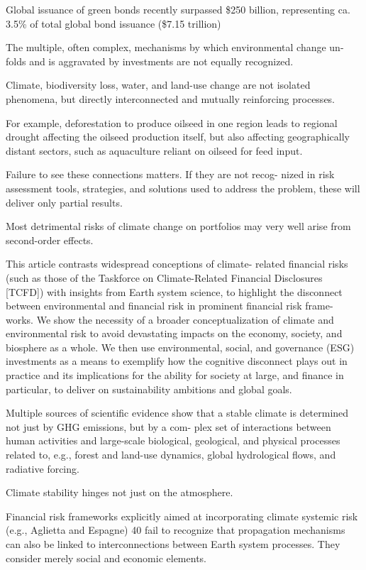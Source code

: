 \documentclass[
]{book}
\begin{document}
Global issuance of green bonds recently
surpassed \$250 billion, representing ca. 3.5\% of total global
bond issuance (\$7.15 trillion)

The multiple, often complex, mechanisms by which environmental change un-
folds and is aggravated by investments are not equally recognized.

Climate, biodiversity loss, water, and land-use change
are not isolated phenomena, but directly interconnected and
mutually reinforcing processes.

For example, deforestation to
produce oilseed in one region leads to regional drought affecting
the oilseed production itself, but also affecting geographically
distant sectors, such as aquaculture reliant on oilseed for
feed input.

Failure to see these connections matters. If they are not recog-
nized in risk assessment tools, strategies, and solutions used to
address the problem, these will deliver only partial results.

Most detrimental risks of climate change on portfolios may
very well arise from second-order effects.

This article contrasts widespread conceptions of climate-
related financial risks (such as those of the Taskforce on
Climate-Related Financial Disclosures {[}TCFD{]}) with insights
from Earth system science, to highlight the disconnect between
environmental and financial risk in prominent financial risk frame-
works. We show the necessity of a broader conceptualization of
climate and environmental risk to avoid devastating impacts on
the economy, society, and biosphere as a whole. We then use
environmental, social, and governance (ESG) investments as a
means to exemplify how the cognitive disconnect plays out in
practice and its implications for the ability for society at large,
and finance in particular, to deliver on sustainability ambitions
and global goals.

Multiple sources of scientific evidence show that a stable
climate is determined not just by GHG emissions, but by a com-
plex set of interactions between human activities and large-scale
biological, geological, and physical processes related to, e.g.,
forest and land-use dynamics, global hydrological flows, and
radiative forcing.

Climate stability hinges not just on the atmosphere.

Financial risk frameworks explicitly aimed at
incorporating climate systemic risk (e.g., Aglietta and Espagne) 40
fail to recognize that propagation mechanisms can also be linked
to interconnections between Earth system processes. They
consider merely social and economic elements.
\end{document}
